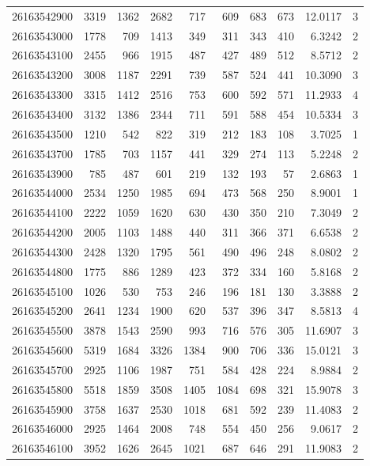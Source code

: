\documentclass[11pt,landscape]{article}
\begin{document}
{\begin{longtable}[]{@{}lrrrrrrrrr@{}}
26163542900 & 3319 & 1362 & 2682 & 717 & 609 & 683 & 673 & 12.0117 & 3 \\
26163543000 & 1778 & 709 & 1413 & 349 & 311 & 343 & 410 & 6.3242 & 2 \\
26163543100 & 2455 & 966 & 1915 & 487 & 427 & 489 & 512 & 8.5712 & 2 \\
26163543200 & 3008 & 1187 & 2291 & 739 & 587 & 524 & 441 & 10.3090 & 3 \\
26163543300 & 3315 & 1412 & 2516 & 753 & 600 & 592 & 571 & 11.2933 & 4 \\
26163543400 & 3132 & 1386 & 2344 & 711 & 591 & 588 & 454 & 10.5334 & 3 \\
26163543500 & 1210 & 542 & 822 & 319 & 212 & 183 & 108 & 3.7025 & 1 \\
26163543700 & 1785 & 703 & 1157 & 441 & 329 & 274 & 113 & 5.2248 & 2 \\
26163543900 & 785 & 487 & 601 & 219 & 132 & 193 & 57 & 2.6863 & 1 \\
26163544000 & 2534 & 1250 & 1985 & 694 & 473 & 568 & 250 & 8.9001 & 1 \\
26163544100 & 2222 & 1059 & 1620 & 630 & 430 & 350 & 210 & 7.3049 & 2 \\
26163544200 & 2005 & 1103 & 1488 & 440 & 311 & 366 & 371 & 6.6538 & 2 \\
26163544300 & 2428 & 1320 & 1795 & 561 & 490 & 496 & 248 & 8.0802 & 2 \\
26163544800 & 1775 & 886 & 1289 & 423 & 372 & 334 & 160 & 5.8168 & 2 \\
26163545100 & 1026 & 530 & 753 & 246 & 196 & 181 & 130 & 3.3888 & 2 \\
26163545200 & 2641 & 1234 & 1900 & 620 & 537 & 396 & 347 & 8.5813 & 4 \\
26163545500 & 3878 & 1543 & 2590 & 993 & 716 & 576 & 305 & 11.6907 & 3 \\
26163545600 & 5319 & 1684 & 3326 & 1384 & 900 & 706 & 336 & 15.0121 & 3 \\
26163545700 & 2925 & 1106 & 1987 & 751 & 584 & 428 & 224 & 8.9884 & 2 \\
26163545800 & 5518 & 1859 & 3508 & 1405 & 1084 & 698 & 321 & 15.9078 & 3 \\
26163545900 & 3758 & 1637 & 2530 & 1018 & 681 & 592 & 239 & 11.4083 & 2 \\
26163546000 & 2925 & 1464 & 2008 & 748 & 554 & 450 & 256 & 9.0617 & 2 \\
26163546100 & 3952 & 1626 & 2645 & 1021 & 687 & 646 & 291 & 11.9083 & 2 \\

\end{longtable}}
\end{document}
